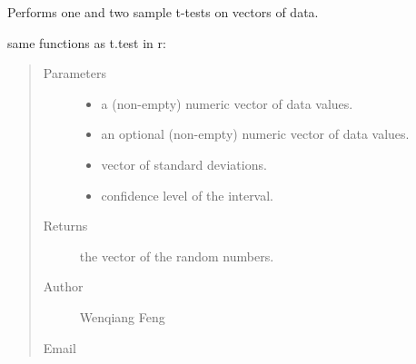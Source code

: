 \documentclass[letterpaper,11pt,english]{sphinxmanual}
\begin{document}
\begin{fulllineitems}
\label{\detokenize{api:statspy.tests.t_test}}
Performs one and two sample t-tests on vectors of data.

same functions as t.test in r: 

\begin{quote}



\end{quote}
\begin{quote}\begin{description}
\item[{Parameters}] \leavevmode\begin{itemize}
\item {} 
 \textendash{} a (non-empty) numeric vector of data values.

\item {} 
 \textendash{} an optional (non-empty) numeric vector of data values.

\item {} 
 \textendash{} vector of standard deviations.

\item {} 
 \textendash{} confidence level of the interval.

\end{itemize}

\item[{Returns}] \leavevmode
the vector of the random numbers.

\item[{Author}] \leavevmode
Wenqiang Feng

\item[{Email}] \leavevmode
{}

\end{description}\end{quote}

\end{fulllineitems}
\end{document}
